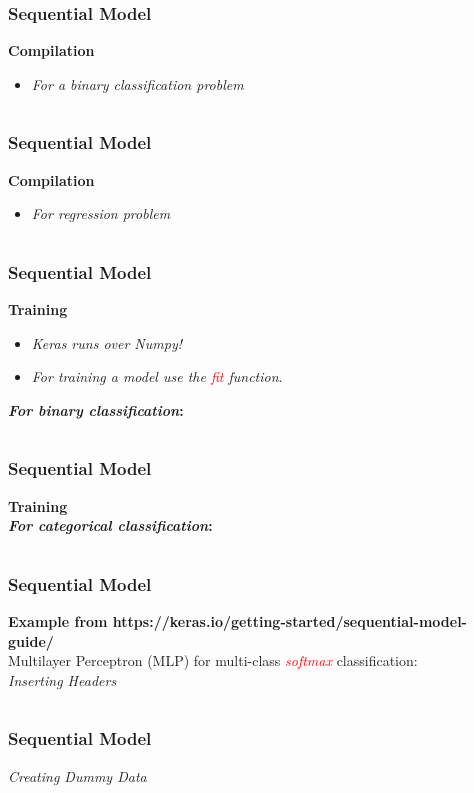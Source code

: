 \documentclass[aspectratio=169]{beamer}
\begin{document}
\begin{frame}
\frametitle{Sequential Model}
\textbf{Compilation}
\\[0.5cm]
\begin{itemize}
\item \textit{For a binary classification problem}
\inputminted{python}{three.py}
\end{itemize}
\end{frame}

\begin{frame}
\frametitle{Sequential Model}
\textbf{Compilation}
\\[0.5cm]
\begin{itemize}
\item \textit{For regression  problem}
\inputminted{python}{four.py}
\end{itemize}
\end{frame}

\begin{frame}
\frametitle{Sequential Model}
\textbf{Training}
\\[0.1cm]
\begin{itemize}
\item \textit{Keras runs over Numpy!}
\item \textit{For training a model use the \textcolor{red}{fit} function}.
\end{itemize}
\textbf{\textit{For binary classification}:}
\inputminted{python}{six.py}
\end{frame}

\begin{frame}
\frametitle{Sequential Model}
\textbf{Training}
\\[0.5cm]
\textbf{\textit{For categorical classification}:}
\inputminted{python}{seven.py}
\end{frame}

\begin{frame}
\frametitle{Sequential Model}
\textbf{Example from https://keras.io/getting-started/sequential-model-guide/}
\\[0.3cm]
Multilayer Perceptron (MLP) for multi-class \textit{\textcolor{red}{softmax}} classification:
\\[0.3cm]
\textit{Inserting Headers}
\inputminted{python}{eight.py}
\end{frame}

\begin{frame}
\frametitle{Sequential Model}
\textit{Creating Dummy Data}
\inputminted{python}{nine.py}
\end{frame}
\end{document}
